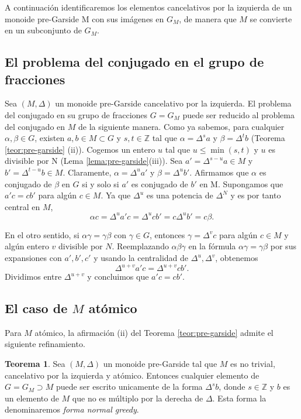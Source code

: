 \documentclass[12pt]{book}
\theoremstyle{definition}
\newtheorem{teor}{Teorema}[section]
\begin{document}
A continuación identificaremos los elementos cancelativos por la izquierda de un monoide pre-Garside M con sus imágenes en $G_M$, de manera que $M$ se convierte en un subconjunto de $G_M$.

\subsection{El problema del conjugado en el grupo de fracciones}
\label{sec:pc_grfr}
Sea $(M,\Delta)$ un monoide pre-Garside cancelativo por la izquierda. El problema del conjugado en su grupo de fracciones $G=G_M$ puede ser reducido al problema del conjugado en $M$ de la siguiente manera. Como ya sabemos, para cualquier $\alpha,\beta\in G$, existen $a,b\in M\subset G$ y $s,t\in\mathbb{Z}$ tal que $\alpha=\Delta^sa$ y $\beta=\Delta^t b$ (Teorema \ref{teor:pre-garside} (\textrm{ii})). Cogemos un entero $u$ tal que $u\leq \min(s,t)$ y $u$ es divisible por N (Lema \ref{lema:pre-garside}(iii)). Sea $a'=\Delta^{s-u}a\in M$ y $b'=\Delta^{t-u}b\in M$. Claramente, $\alpha=\Delta^ua'$ y $\beta=\Delta^ub'$. Afirmamos que $\alpha$ es conjugado de $\beta$ en $G$ si y solo si $a'$ es conjugado de $b'$ en M. Supongamos que $a'c=cb'$ para algún $c\in M$. Ya que $\Delta^u$ es una potencia de $\Delta^N$ y es por tanto central en $M$,
$$\alpha c=\Delta^u a'c=\Delta^u c b' = c\Delta^u b'=c\beta.$$

En el otro sentido, si $\alpha\gamma=\gamma\beta$ con $\gamma\in G$, entonces $\gamma=\Delta^v c$ para algún $c\in M$ y algún entero $v$ divisible por $N$. Reemplazando $\alpha\beta\gamma$ en la fórmula $\alpha\gamma=\gamma\beta$ por sus expansiones con $a',b',c'$ y usando la centralidad de $\Delta^u,\Delta^v$, obtenemos
$$\Delta^{u+v}a'c=\Delta^{u+v}cb'.$$
Dividimos entre $\Delta^{u+v}$ y concluimos que $a'c=cb'$.

\subsection{El caso de $M$ atómico}

Para $M$ atómico, la afirmación (ii) del Teorema \ref{teor:pre-garside} admite el siguiente refinamiento.

\begin{teor}
Sea $(M,\Delta)$ un monoide pre-Garside tal que $M$ es no trivial, cancelativo por la izquierda y atómico. Entonces cualquier elemento de $G=G_M\supset M$ puede ser escrito unicamente de la forma $\Delta^s b$, donde $s\in\mathbb{Z}$ y $b$ es un elemento de $M$ que no es múltiplo por la derecha de $\Delta$. Esta forma la denominaremos \textit{forma normal greedy}.
\label{teor:refi}
\end{teor}
\end{document}
